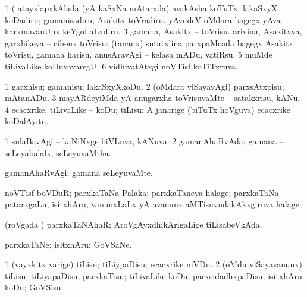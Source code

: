 \noindent
\gl{\pagu}
\bmng
\bnum
\num{1}  (  atayxlapxkAlada (yA kaSxNa mAtarxda) avakAsha koTuTx. 
  
\banum
{} lakaSxyX koDadiru; gamanisadiru; Asakitx toVradiru. 
 yAvudeV oMdara bagegx yAva karxmavanUnx keYgoLaLxdiru. 
\eanum
\numie
\num{3}  gamana, Asakitx -- toVrisu. 
  
\banum
{} arivina, Asakitxya, garxhikeya -- cihenx toVrisu:  (tananx) sutatxlina parxpaMcada bagegx Asakitx toVrisu, gamana harisu. 
 anusAravAgi -- kelasa mADu, vatiRsu. 
\eanum
\numie
\num{5}  muMde tiLivaLike koDuvavaregU. 
\num{6}  vidhivatAtxgi noVTisf koTiTxruva. 
\enum
\emng
\eentry

\bentry
{}
\gl{\sakirx}
\bmng
\bnum
\num{1} garxhisu; gamanisu; lakaSxyXkoDu. 
\num{2} (oMdara viSayavAgi) parxsAtxpisu; mAtanADu. 
\num{3} mayARdeyiMda yA anugarxha toVrisuvaMte -- satakxrisu, kANu. 
\num{4} ecacxrike, tiLivaLike -- koDu; tiLisu:  A janarige (biTuTx hoVguva) ecacxrike koDalAyitu. 
\enum
\emng
\eentry

\bentry
{}
\gl{\gu}
\bmng
\bnum
\num{1} sulaBavAgi -- kaNiNxge biVLuva, kANuva. 
\num{2} gamanAhaRvAda; gamana -- seLeyabalalx, seLeyuvaMtha. 
\enum
\emng
\eentry

\bentry
{}
\gl{\kirxvi}
\bmng
gamanAhaRvAgi; gamana seLeyuvaMte. 
\emng
\eentry

\bentry
{}
\gl{\nA}
\bmng
noVTisf boVDuR; parxkaTaNa Palaka; parxkaTaneya halage; parxkaTaNa patarxgaLu, isitxhAru, \mo vanunxLaLx yA avanunx aMTisuvudakAkxgiruva halage. 
\emng
\eentry

\bentry
{}
\gl{\gu}
\bmng
(roVgada \vi) parxkaTaNAhaR; AroVgAyxdhikArigaLige tiLisabeVkAda. 
\emng
\eentry

\bentry
{}
\gl{\nA}
\bmng
parxkaTaNe; isitxhAru; GoVSaNe. 
\emng
\eentry

\bentry
{}
\gl{\sakirx}
\bmng
\bnum
\num{1} (vayxkitx \mo varige) tiLisu; tiLiypaDisu; ecacxrike niVDu. 
\num{2} (oMdu viSayavanunx) tiLisu; tiLiyapaDisu; parxkaTisu; tiLivaLike koDu; parxsidadhxpaDisu; isitxhAru koDu; GoVSisu. 
\enum
\emng
\eentry

